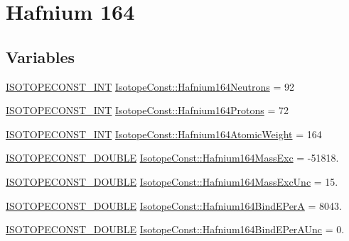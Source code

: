 \hypertarget{group___isotope_const-_hafnium-_hf164}{}\section{Hafnium 164}
\label{group___isotope_const-_hafnium-_hf164}
\subsection*{Variables}
\begin{DoxyCompactItemize}
\item 
\mbox{\hyperlink{group___isotope_const-_macros_ga5f18360b3e99483a35c32d789e62621c}{I\+S\+O\+T\+O\+P\+E\+C\+O\+N\+S\+T\+\_\+\+I\+NT}} \mbox{\hyperlink{group___isotope_const-_hafnium-_hf164_ga836d77345ed18dec1a6cc68bf2aa3a3f}{Isotope\+Const\+::\+Hafnium164\+Neutrons}} = 92
\item 
\mbox{\hyperlink{group___isotope_const-_macros_ga5f18360b3e99483a35c32d789e62621c}{I\+S\+O\+T\+O\+P\+E\+C\+O\+N\+S\+T\+\_\+\+I\+NT}} \mbox{\hyperlink{group___isotope_const-_hafnium-_hf164_gaa86f6ede8928cc1320fd18f90c6fd6de}{Isotope\+Const\+::\+Hafnium164\+Protons}} = 72
\item 
\mbox{\hyperlink{group___isotope_const-_macros_ga5f18360b3e99483a35c32d789e62621c}{I\+S\+O\+T\+O\+P\+E\+C\+O\+N\+S\+T\+\_\+\+I\+NT}} \mbox{\hyperlink{group___isotope_const-_hafnium-_hf164_gae73b583ca60dc337fe074e3b80256894}{Isotope\+Const\+::\+Hafnium164\+Atomic\+Weight}} = 164
\item 
\mbox{\hyperlink{group___isotope_const-_macros_ga8f45a7272ce02c0b4c65c44636ed719a}{I\+S\+O\+T\+O\+P\+E\+C\+O\+N\+S\+T\+\_\+\+D\+O\+U\+B\+LE}} \mbox{\hyperlink{group___isotope_const-_hafnium-_hf164_gaf365c6cf1f8f7d133bd24b5cfb7369ca}{Isotope\+Const\+::\+Hafnium164\+Mass\+Exc}} = -\/51818.
\item 
\mbox{\hyperlink{group___isotope_const-_macros_ga8f45a7272ce02c0b4c65c44636ed719a}{I\+S\+O\+T\+O\+P\+E\+C\+O\+N\+S\+T\+\_\+\+D\+O\+U\+B\+LE}} \mbox{\hyperlink{group___isotope_const-_hafnium-_hf164_gad073ff1b6c0885118b7912b39af868d2}{Isotope\+Const\+::\+Hafnium164\+Mass\+Exc\+Unc}} = 15.
\item 
\mbox{\hyperlink{group___isotope_const-_macros_ga8f45a7272ce02c0b4c65c44636ed719a}{I\+S\+O\+T\+O\+P\+E\+C\+O\+N\+S\+T\+\_\+\+D\+O\+U\+B\+LE}} \mbox{\hyperlink{group___isotope_const-_hafnium-_hf164_gadb49164349d42c8e5a847d44b201d104}{Isotope\+Const\+::\+Hafnium164\+Bind\+E\+PerA}} = 8043.
\item 
\mbox{\hyperlink{group___isotope_const-_macros_ga8f45a7272ce02c0b4c65c44636ed719a}{I\+S\+O\+T\+O\+P\+E\+C\+O\+N\+S\+T\+\_\+\+D\+O\+U\+B\+LE}} \mbox{\hyperlink{group___isotope_const-_hafnium-_hf164_ga4119cdc7f216d87d344353c8ef0fa1f8}{Isotope\+Const\+::\+Hafnium164\+Bind\+E\+Per\+A\+Unc}} = 0.

\end{DoxyCompactItemize}
